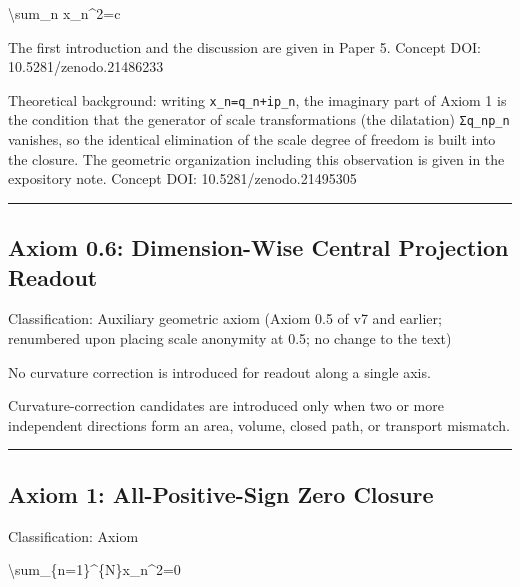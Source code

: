 \documentclass[
  a4paper,
]{article}
\newenvironment{Shaded}{}{}
\newcommand{\NormalTok}[1]{#1}
\begin{document}
\begin{Shaded}
\begin{Highlighting}[]
\NormalTok{\textbackslash{}sum\_n x\_n\^{}2=c}
\end{Highlighting}
\end{Shaded}

The first introduction and the discussion are given in Paper 5. Concept
DOI: 10.5281/zenodo.21486233

Theoretical background: writing \texttt{x\_n=q\_n+ip\_n}, the imaginary
part of Axiom 1 is the condition that the generator of scale
transformations (the dilatation) \texttt{Σq\_np\_n} vanishes, so the
identical elimination of the scale degree of freedom is built into the
closure. The geometric organization including this observation is given
in the expository note. Concept DOI: 10.5281/zenodo.21495305

\begin{center}\rule{0.5\linewidth}{0.5pt}\end{center}

\subsection{Axiom 0.6: Dimension-Wise Central Projection
Readout}\label{axiom-0.6-dimension-wise-central-projection-readout}

Classification: Auxiliary geometric axiom (Axiom 0.5 of v7 and earlier;
renumbered upon placing scale anonymity at 0.5; no change to the text)

No curvature correction is introduced for readout along a single axis.

Curvature-correction candidates are introduced only when two or more
independent directions form an area, volume, closed path, or transport
mismatch.

\begin{center}\rule{0.5\linewidth}{0.5pt}\end{center}

\subsection{Axiom 1: All-Positive-Sign Zero
Closure}\label{axiom-1-all-positive-sign-zero-closure}

Classification: Axiom

\begin{Shaded}
\begin{Highlighting}[]
\NormalTok{\textbackslash{}sum\_\{n=1\}\^{}\{N\}x\_n\^{}2=0}
\end{Highlighting}
\end{Shaded}
\end{document}

